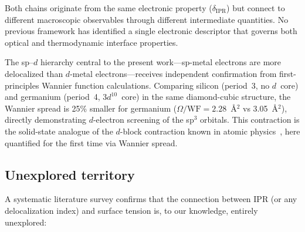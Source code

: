 \documentclass[twocolumn,showpacs,preprintnumbers,amsmath,amssymb,prb]{revtex4-2}
\begin{document}
Both chains originate from the same electronic property
($\delta_\mathrm{IPR}$) but connect to different macroscopic
observables through different intermediate quantities.
No previous framework has identified a single electronic
descriptor that governs both optical and thermodynamic
interface properties.

The sp--$d$ hierarchy central to the present work---sp-metal
electrons are more delocalized than $d$-metal electrons---receives
independent confirmation from first-principles Wannier function
calculations. Comparing silicon (period~3, no $d$~core) and
germanium (period~4, 3$d^{10}$~core) in the same diamond-cubic
structure, the Wannier spread is 25\% smaller for germanium
($\Omega/\mathrm{WF} = 2.28$~\AA$^2$ vs 3.05~\AA$^2$),
directly demonstrating $d$-electron screening of the sp$^3$
orbitals. This contraction is the solid-state analogue of
the $d$-block contraction known in atomic
physics~\cite{Pyykko1988}, here quantified for the first
time via Wannier spread.

\subsection{Unexplored territory}

A systematic literature survey confirms that the connection
between IPR (or any delocalization index) and surface tension
is, to our knowledge, entirely unexplored:
\end{document}
